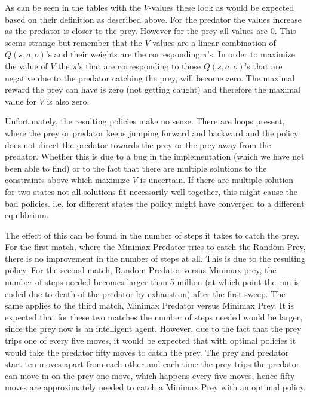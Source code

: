 As can be seen in the tables with the $V$-values these look as would be expected based on their definition as described above. For the predator the values increase as the predator is closer to the prey. However for the prey all values are 0. This seems strange but remember that the $V$ values are a linear combination of $Q(s,a,o)$'s and their weights are the corresponding $\pi$'s. In order to maximize the value of $V$ the $\pi$'s that are corresponding to those $Q(s,a,o)$'s that are negative due to the predator catching the prey, will become zero. The maximal reward the prey can have is zero (not getting caught) and therefore the maximal value for $V$ is also zero.  

Unfortunately, the resulting policies make no sense. There are loops present, where the prey or predator keeps jumping forward and backward and the policy does not direct the predator towards the prey or the prey away from the predator. Whether this is due to a bug in the implementation (which we have not been able to find) or to the fact that there are multiple solutions to the constraints above which maximize $V$ is uncertain. If there are multiple solution for two states not all solutions fit necessarily well together, this might cause the bad policies. i.e. for different states the policy might have converged to a different equilibrium.

The effect of this can be found in the number of steps it takes to catch the prey. For the first match, where the Minimax Predator tries to catch the Random Prey, there is no improvement in the number of steps at all. This is due to the resulting policy. For the second match, Random Predator versus Minimax prey, the number of steps needed becomes larger than 5 million (at which point the run is ended due to death of the predator by exhaustion) after the first sweep. The same applies to the third match, Minimax Predator versus Minimax Prey. It is expected that for these two matches the number of steps needed would be larger, since the prey now is an intelligent agent. However, due to the fact that the prey trips one of every five moves, it would be expected that with optimal policies it would take the predator fifty moves to catch the prey. The prey and predator start ten moves apart from each other and each time the prey trips the predator can move in on the prey one move, which happens every five moves, hence fifty moves are approximately needed to catch a Minimax Prey with an optimal policy.  


